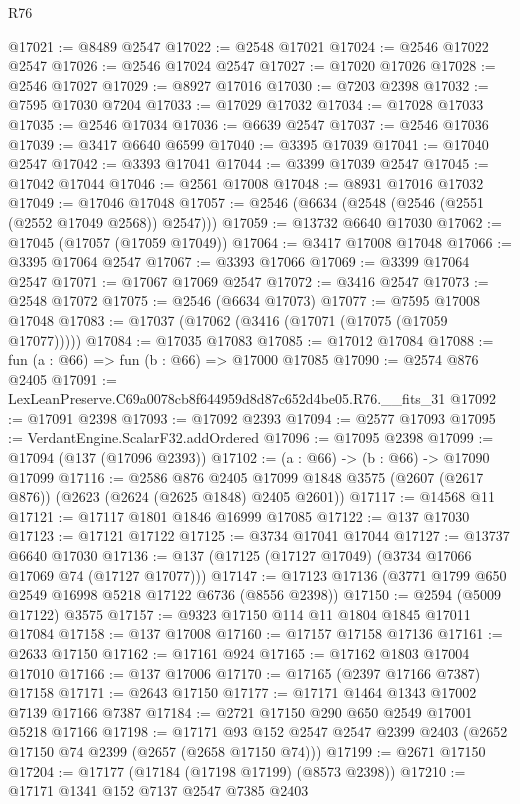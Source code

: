 \begin{lexlean}{R76}
\begin{coremodule}
@17021 := @8489 @2547
@17022 := @2548 @17021
@17024 := @2546 @17022 @2547
@17026 := @2546 @17024 @2547
@17027 := @17020 @17026
@17028 := @2546 @17027
@17029 := @8927 @17016
@17030 := @7203 @2398
@17032 := @7595 @17030 @7204
@17033 := @17029 @17032
@17034 := @17028 @17033
@17035 := @2546 @17034
@17036 := @6639 @2547
@17037 := @2546 @17036
@17039 := @3417 @6640 @6599
@17040 := @3395 @17039
@17041 := @17040 @2547
@17042 := @3393 @17041
@17044 := @3399 @17039 @2547
@17045 := @17042 @17044
@17046 := @2561 @17008
@17048 := @8931 @17016 @17032
@17049 := @17046 @17048
@17057 := @2546 (@6634 (@2548 (@2546 (@2551 (@2552 @17049 @2568)) @2547)))
@17059 := @13732 @6640 @17030
@17062 := @17045 (@17057 (@17059 @17049))
@17064 := @3417 @17008 @17048
@17066 := @3395 @17064 @2547
@17067 := @3393 @17066
@17069 := @3399 @17064 @2547
@17071 := @17067 @17069 @2547
@17072 := @3416 @2547
@17073 := @2548 @17072
@17075 := @2546 (@6634 @17073)
@17077 := @7595 @17008 @17048
@17083 := @17037 (@17062 (@3416 (@17071 (@17075 (@17059 @17077)))))
@17084 := @17035 @17083
@17085 := @17012 @17084
@17088 := fun (a : @66) => fun (b : @66) => @17000 @17085
@17090 := @2574 @876 @2405
@17091 := LexLeanPreserve.C69a0078cb8f644959d8d87c652d4be05.R76.__fits_31
@17092 := @17091 @2398
@17093 := @17092 @2393
@17094 := @2577 @17093
@17095 := VerdantEngine.ScalarF32.addOrdered
@17096 := @17095 @2398
@17099 := @17094 (@137 (@17096 @2393))
@17102 := (a : @66) -> (b : @66) -> @17090 @17099
@17116 := @2586
    @876
    @2405
    @17099
    @1848
    @3575
    (@2607 (@2617 @876))
    (@2623 (@2624 (@2625 @1848) @2405 @2601))
@17117 := @14568 @11
@17121 := @17117 @1801 @1846 @16999 @17085
@17122 := @137 @17030
@17123 := @17121 @17122
@17125 := @3734 @17041 @17044
@17127 := @13737 @6640 @17030
@17136 := @137 (@17125 (@17127 @17049) (@3734 @17066 @17069 @74 (@17127 @17077)))
@17147 := @17123 @17136 (@3771 @1799 @650 @2549 @16998 @5218 @17122 @6736 (@8556 @2398))
@17150 := @2594 (@5009 @17122) @3575
@17157 := @9323 @17150 @114 @11 @1804 @1845 @17011 @17084
@17158 := @137 @17008
@17160 := @17157 @17158 @17136
@17161 := @2633 @17150
@17162 := @17161 @924
@17165 := @17162 @1803 @17004 @17010
@17166 := @137 @17006
@17170 := @17165 (@2397 @17166 @7387) @17158
@17171 := @2643 @17150
@17177 := @17171 @1464 @1343 @17002 @7139 @17166 @7387
@17184 := @2721 @17150 @290 @650 @2549 @17001 @5218 @17166
@17198 := @17171
    @93
    @152
    @2547
    @2547
    @2399
    @2403
    (@2652 @17150 @74 @2399 (@2657 (@2658 @17150 @74)))
@17199 := @2671 @17150
@17204 := @17177 (@17184 (@17198 @17199) (@8573 @2398))
@17210 := @17171 @1341 @152 @7137 @2547 @7385 @2403

\end{coremodule}
\end{lexlean}
